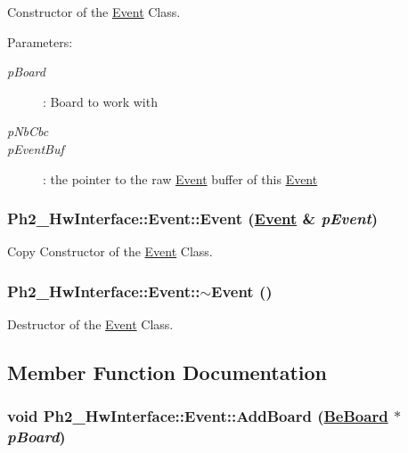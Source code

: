 Constructor of the \hyperlink{class_ph2___hw_interface_1_1_event}{Event} Class. 

\begin{Desc}
\item[Parameters:]
\begin{description}
\item[{\em p\-Board}]: Board to work with \item[{\em p\-Nb\-Cbc}]\item[{\em p\-Event\-Buf}]: the pointer to the raw \hyperlink{class_ph2___hw_interface_1_1_event}{Event} buffer of this \hyperlink{class_ph2___hw_interface_1_1_event}{Event} \end{description}
\end{Desc}
\hypertarget{class_ph2___hw_interface_1_1_event_3f676bea23859e6417f1ccbade7308df}{
\subsubsection[Event]{\setlength{\rightskip}{0pt plus 5cm}Ph2\_\-Hw\-Interface::Event::Event (\hyperlink{class_ph2___hw_interface_1_1_event}{Event} \& {\em p\-Event})}}
\label{class_ph2___hw_interface_1_1_event_3f676bea23859e6417f1ccbade7308df}


Copy Constructor of the \hyperlink{class_ph2___hw_interface_1_1_event}{Event} Class. 

\hypertarget{class_ph2___hw_interface_1_1_event_2698d395adfcd65d0853676a899127fc}{
\subsubsection[$\sim$Event]{\setlength{\rightskip}{0pt plus 5cm}Ph2\_\-Hw\-Interface::Event::$\sim$Event ()}}
\label{class_ph2___hw_interface_1_1_event_2698d395adfcd65d0853676a899127fc}


Destructor of the \hyperlink{class_ph2___hw_interface_1_1_event}{Event} Class. 



\subsection{Member Function Documentation}
\hypertarget{class_ph2___hw_interface_1_1_event_f3c69c800172c254f020628293c232b9}{
\subsubsection[AddBoard]{\setlength{\rightskip}{0pt plus 5cm}void Ph2\_\-Hw\-Interface::Event::Add\-Board (\hyperlink{class_ph2___hw_description_1_1_be_board}{Be\-Board} $\ast$ {\em p\-Board})}}
\label{class_ph2___hw_interface_1_1_event_f3c69c800172c254f020628293c232b9}


